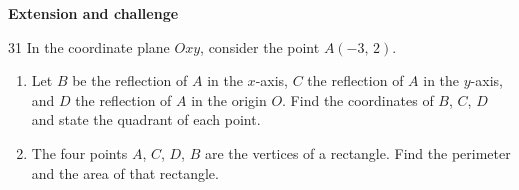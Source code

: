 \documentclass[11pt]{article}
\newenvironment{probbox}[2]{\begin{probboxT}{#1}{#2}}{\end{probboxT}}
\newcommand{\dividerbar}[1]{\par\vspace{0.6em}\noindent
  \begin{tcolorbox}[enhanced,frame hidden,interior hidden,borderline west={5pt}{0pt}{ProbBlue},
    colback=white,left=12pt,right=12pt,top=5pt,bottom=5pt,arc=4pt]
  {\large\bfseries\color{ProbBlue} #1}\end{tcolorbox}\vspace{0.4em}}
\begin{document}
\clearpage
\dividerbar{Extension and challenge}

\begin{probbox}{31}{\relax}
In the coordinate plane $Oxy$, consider the point $A(-3,\,2)$.
\begin{enumerate}[label=\alph*),leftmargin=1.6em,itemsep=0pt,topsep=2pt]
  \item Let $B$ be the reflection of $A$ in the $x$-axis, $C$ the reflection of $A$ in the $y$-axis, and $D$ the reflection of $A$ in the origin $O$. Find the coordinates of $B$, $C$, $D$ and state the quadrant of each point.
  \item The four points $A$, $C$, $D$, $B$ are the vertices of a rectangle. Find the perimeter and the area of that rectangle.
\end{enumerate}
\end{probbox}
\end{document}
